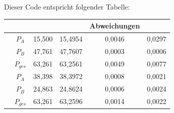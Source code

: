 \documentclass[
12pt,
a4paper,
headings=small,                    %
bibliography=totoc,                %
listof=totoc,                      %
parskip=half*,                     %
]{scrartcl}                        %
\renewcommand{\arraystretch}{1.15}
\begin{document}
	Dieser Code entspricht folgender Tabelle:
		\begin{table}[H]
		\centering
		\renewcommand{\arraystretch}{2} %
		\setlength{\tabcolsep}{0.3em} %
		
		\begin{tabular}{|c|c|S[ table-format = 2.3]|S[ table-format = 2.3]|
				S[ table-format = 1.4]|S[ table-format = 1.4]|}
			\hline
			& {} & {} &{Abweichungen} 
			&{} \\ \hline
			&  $P_A$ & 15,500 & 15,4954 & 0,0046 & 0,0297 \\  
			& $P_B$ & 47,761 & 47,7607 & 0,0003 & 0,0006 \\  
			& $P_{ges}$ & 63,261 & 63,2561 & 0,0049 & 0,0077 \\ \hline
			& $P_A$ & 38,398 & 38,3972 & 0,0008 & 0,0021 \\  
			& $P_B$ & 24,863 & 24,8624 & 0,0006 & 0,0024 \\  
			& $P_{ges}$ & 63,261 & 63,2596 & 0,0014 & 0,0022 \\ \hline
		\end{tabular}
	\end{table}
	
	
	\newpage
	\printbibliography
	
\end{document}
